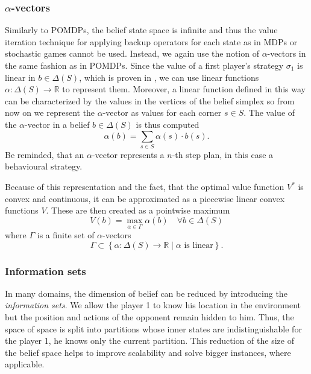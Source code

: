 \documentclass[../main.tex]{subfiles}
\begin{document}
\subsubsection{$\alpha$-vectors}\label{standard:osposg:valfunc:alpha}
Similarly to POMDPs, the belief state space is infinite and thus the value iteration technique for applying backup operators for each state as in MDPs or stochastic games cannot be used.
Instead, we again use the notion of $\alpha$-vectors in the same fashion as in POMDPs.
Since the value of a first player's strategy $\sigma_1$ is linear in $b \in \Delta(S)$, which is proven in \cite{poposgsthesis}, we can use linear functions $\alpha : \Delta(S) \to \mathbb{R}$ to represent them.
Moreover, a linear function defined in this way can be characterized by the values in the vertices of the belief simplex so from now on we represent the $\alpha$-vector as values for each corner $s \in S$.
The value of the $\alpha$-vector in a belief $b \in \Delta(S)$ is thus computed
\begin{equation}
    \alpha(b) = \sum_{s \in S} \alpha(s) \cdot b(s).
\end{equation}
Be reminded, that an $\alpha$-vector represents a $n$-th step plan, in this case a behavioural strategy.

Because of this representation and the fact, that the optimal value function $V^*$ is convex and continuous, it can be approximated as a piecewise linear convex functions $V$.
These are then created as a pointwise maximum
\begin{equation}
    V(b) = \max_{\alpha \in \Gamma} \alpha(b) \quad \forall b \in \Delta(S)
\end{equation}
where $\Gamma$ is a finite set of $\alpha$-vectors
\begin{equation}
    \Gamma \subset \left\{\alpha: \Delta(S) \to \mathbb{R} \mid \alpha \text{ is linear}\right\}.
\end{equation}

\subsubsection{Information sets}\label{standard:osposg:infoset}
In many domains, the dimension of belief can be reduced by introducing the \textit{information sets}.
We allow the player 1 to know his location in the environment but the position and actions of the opponent remain hidden to him.
Thus, the space of space is split into partitions whose inner states are indistinguishable for the player 1, he knows only the current partition.
This reduction of the size of the belief space helps to improve scalability and solve bigger instances, where applicable.
\end{document}

